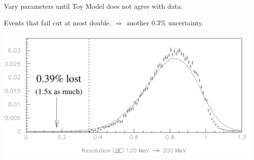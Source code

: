 \documentclass[landscape]{article}
\begin{document}
\vfill

Vary parameters until Toy Model does not agree with data.

\vfill

Events that fail cut at most double.  $\Longrightarrow$ another 0.3\% uncertainty.

\vfill

\includegraphics[width=\linewidth]{toymodel4_revamp.pdf}

\pagebreak
\end{document}
